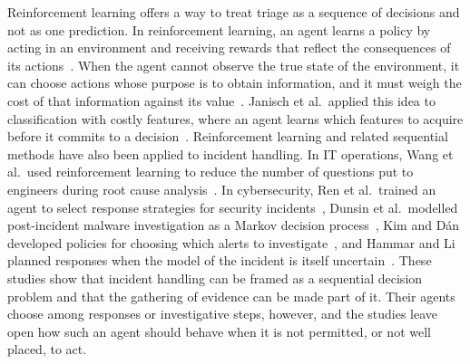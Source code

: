 Reinforcement learning offers a way to treat triage as a sequence of decisions and not as one prediction. In reinforcement learning, an agent learns a policy by acting in an environment and receiving rewards that reflect the consequences of its actions~\cite{sutton2018}. When the agent cannot observe the true state of the environment, it can choose actions whose purpose is to obtain information, and it must weigh the cost of that information against its value~\cite{kaelbling1998}. Janisch et al.\ applied this idea to classification with costly features, where an agent learns which features to acquire before it commits to a decision~\cite{janisch2019}. Reinforcement learning and related sequential methods have also been applied to incident handling. In IT operations, Wang et al.\ used reinforcement learning to reduce the number of questions put to engineers during root cause analysis~\cite{wang2023hrlhf}. In cybersecurity, Ren et al.\ trained an agent to select response strategies for security incidents~\cite{ren2025}, Dunsin et al.\ modelled post-incident malware investigation as a Markov decision process~\cite{dunsin2025}, Kim and D\'{a}n developed policies for choosing which alerts to investigate~\cite{kim2025}, and Hammar and Li planned responses when the model of the incident is itself uncertain~\cite{hammar2025}. These studies show that incident handling can be framed as a sequential decision problem and that the gathering of evidence can be made part of it. Their agents choose among responses or investigative steps, however, and the studies leave open how such an agent should behave when it is not permitted, or not well placed, to act.

